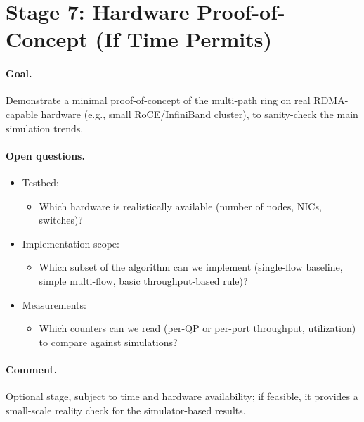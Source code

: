 \documentclass[12pt]{article}
\begin{document}
\newpage
\section*{Stage 7: Hardware Proof-of-Concept (If Time Permits)}

\paragraph{Goal.}
Demonstrate a minimal proof-of-concept of the multi-path ring on real RDMA-capable hardware (e.g., small RoCE/InfiniBand cluster), to sanity-check the main simulation trends.

\paragraph{Open questions.}
\begin{itemize}[leftmargin=*]
  \item Testbed:
        \begin{itemize}
            \item Which hardware is realistically available (number of nodes, NICs, switches)?
        \end{itemize}
  \item Implementation scope:
        \begin{itemize}
            \item Which subset of the algorithm can we implement (single-flow baseline, simple multi-flow, basic throughput-based rule)?
        \end{itemize}
  \item Measurements:
        \begin{itemize}
            \item Which counters can we read (per-QP or per-port throughput, utilization) to compare against simulations?
        \end{itemize}
\end{itemize}

\paragraph{Comment.}
Optional stage, subject to time and hardware availability; if feasible, it provides a small-scale reality check for the simulator-based results.
\end{document}
